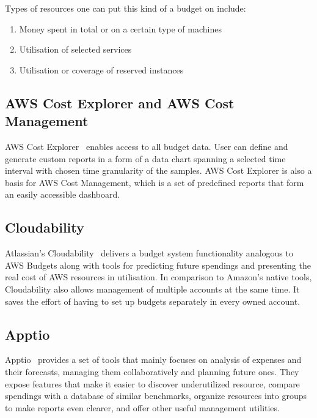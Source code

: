 \documentclass[licencjacka,en]{thesisclass}
\begin{document}
    Types of resources one can put this kind of a budget on include:

    \begin{enumerate}
        \item Money spent in total or on a certain type of machines
        \item Utilisation of selected services
        \item Utilisation or coverage of reserved instances
    \end{enumerate}

    \subsection{AWS Cost Explorer and AWS Cost Management}

    AWS Cost Explorer~\cite{CostExplorer} enables access to all budget data.
    User can define and generate custom reports in a form
    of a data chart spanning a selected time interval
    with chosen time granularity of the samples.
    AWS Cost Explorer is also a basis for AWS Cost Management,
    which is a set of predefined reports
    that form an easily accessible dashboard.

    \subsection{Cloudability}

    Atlassian's Cloudability~\cite{Cloudability} delivers
    a budget system functionality analogous to AWS Budgets
    along with tools for predicting future spendings
    and presenting the real cost of AWS resources in utilisation.
    In comparison to Amazon's native tools, Cloudability
    also allows management of multiple accounts at the same time.
    It saves the effort of having to set up budgets separately in every owned account.

    \subsection{Apptio}

    Apptio~\cite{Apptio} provides a set of tools that mainly focuses on analysis
    of expenses and their forecasts,
    managing them collaboratively and planning future ones.
    They expose features that make it easier to discover underutilized resource,
    compare spendings with a database of similar benchmarks,
    organize resources into groups to make reports even clearer,
    and offer other useful management utilities.
\end{document}
